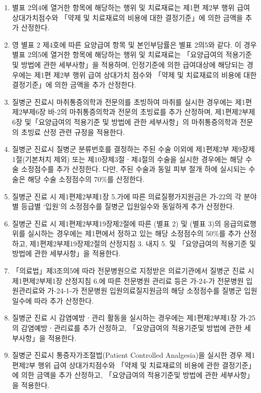 \begin{enumerate}[1.]
\item 별표 2의4에 열거한 항목에 해당하는 행위 및 치료재료는 제1편 제2부 행위 급여 상대가치점수와 「약제 및 치료재료의 비용에 대한 결정기준」에 의한 금액을 추가 산정한다.
\item 영 별표 2 제4호에 따른 요양급여 항목 및 본인부담률은 별표 2의5와 같다. 이 경우 별표 2의5에 열거한 항목에 해당하는 행위 및 치료재료는 「요양급여의 적용기준 및 방법에 관한 세부사항」을 적용하며, 인정기준에 의한 급여대상에 해당되는 경우에는 제1편 제2부 행위 급여 상대가치 점수와 「약제 및 치료재료의 비용에 대한 결정기준」에 의한 금액을 추가 산정한다.
\item 질병군 진료시 마취통증의학과 전문의를 초빙하여 마취를 실시한 경우에는 제1편제2부제6장 바-2의 마취통증의학과 전문의 초빙료를 추가 산정하며, 제1편제2부제6장 및「요양급여의 적용기준 및 방법에 관한 세부사항」의 마취통증의학과 전문의 초빙료 산정 관련 규정을 적용한다.
\item 질병군 진료시 질병군 분류번호를 결정하는 주된 수술 이외에 제1편제2부 제9장제1절(기본처치 제외) 또는 제10장제3절ㆍ제4절의 수술을 실시한 경우에는 해당 수술 소정점수를 추가 산정한다. 다만, 주된 수술과 동일 피부 절개 하에 실시되는 수술은 해당 수술 소정점수의 70\%를 산정한다.
\item 질병군 진료 시 제1편제2부제1장 5.가에 따른 의료질평가지원금은 가-22의 각 분야별 등급별 ‘입원’의 소정점수를 질병군 입원일수와 동일하게 추가 산정한다.
\item 질병군 진료 시 제1편제2부제19장제2절에 따른 (별표 2) 및 (별표 3)의 응급의료행위를 실시하는 경우에는 제1편에서 정하고 있는 해당 소정점수의 50\%를 추가 산정하고, 제1편제2부제19장제2절의 산정지침 3. 내지 5. 및 「요양급여의 적용기준 및 방법에 관한 세부사항」을 적용한다.
\item「의료법」제3조의5에 따라 전문병원으로 지정받은 의료기관에서 질병군 진료 시 제1편제2부제1장 산정지침 6.에 따른 전문병원 관리료 등은 가-24-가 전문병원 입원관리료와 가-24-1-가 전문병원 입원의료질지원금의 해당 소정점수를 질병군 입원일수에 따라 추가 산정한다.
\item 질병군 진료 시 감염예방ㆍ관리 활동을 실시하는 경우에는 제1편제2부제1장 가-25의 감염예방ㆍ관리료를 추가 산정하고, 「요양급여의 적용기준및 방법에 관한 세부사항」을 적용한다.
\item 질병군 진료시 통증자가조절법(Patient Controlled Analgesia)을 실시한 경우 제1편제2부 행위 급여 상대가치점수와 「약제 및 치료재료의 비용에 관한 결정기준」에 의한 금액을 추가 산정하고, 「요양급여의 적용기준및 방법에 관한 세부사항」을 적용한다.
\end{enumerate}

